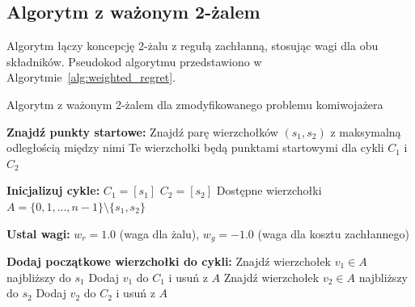 \documentclass[12pt,a4paper]{article}
\begin{document}
\subsection{Algorytm z ważonym 2-żalem}
Algorytm łączy koncepcję 2-żalu z regułą zachłanną, stosując wagi dla obu składników. Pseudokod algorytmu przedstawiono w Algorytmie~\ref{alg:weighted_regret}.

\begin{algorithm}
\caption{Algorytm z ważonym 2-żalem dla zmodyfikowanego problemu komiwojażera}
\label{alg:weighted_regret}
\begin{algorithmic}[1]
\State \textbf{Znajdź punkty startowe:}
\State Znajdź parę wierzchołków $(s_1, s_2)$ z maksymalną odległością między nimi
\State Te wierzchołki będą punktami startowymi dla cykli $C_1$ i $C_2$

\State \textbf{Inicjalizuj cykle:}
\State $C_1 = [s_1]$
\State $C_2 = [s_2]$
\State Dostępne wierzchołki $A = \{0, 1, ..., n-1\} \setminus \{s_1, s_2\}$

\State \textbf{Ustal wagi:} $w_r = 1.0$ (waga dla żalu), $w_g = -1.0$ (waga dla kosztu zachłannego)

\State \textbf{Dodaj początkowe wierzchołki do cykli:}
    \State Znajdź wierzchołek $v_1 \in A$ najbliższy do $s_1$
    \State Dodaj $v_1$ do $C_1$ i usuń z $A$
        \State Znajdź wierzchołek $v_2 \in A$ najbliższy do $s_2$
        \State Dodaj $v_2$ do $C_2$ i usuń z $A$
    \EndIf
\EndIf


\end{algorithmic}
\end{algorithm}
\end{document}
